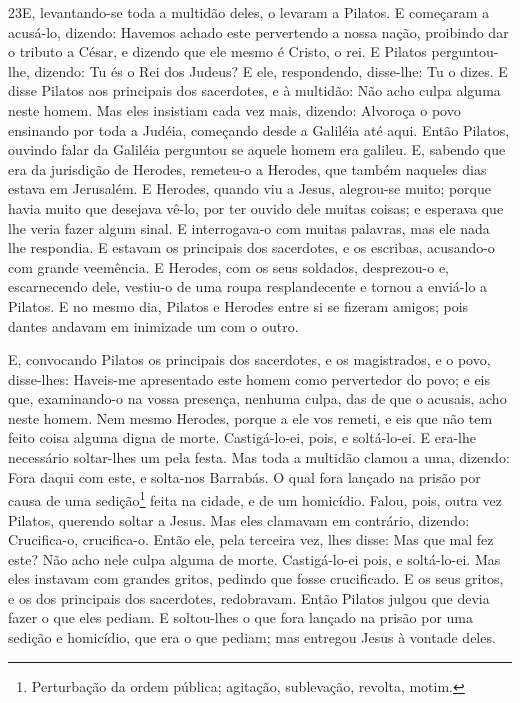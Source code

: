 \medskip

\lettrine{23} E, levantando-se toda a multidão deles, o
levaram a Pilatos. E começaram a acusá-lo, dizendo: Havemos
achado este pervertendo a nossa nação, proibindo dar o tributo a
César, e dizendo que ele mesmo é Cristo, o rei. E Pilatos
perguntou-lhe, dizendo: Tu és o Rei dos Judeus? E ele, respondendo,
disse-lhe: Tu o dizes. E disse Pilatos aos principais dos
sacerdotes, e à multidão: Não acho culpa alguma neste homem. Mas
eles insistiam cada vez mais, dizendo: Alvoroça o povo ensinando por
toda a Judéia, começando desde a Galiléia até aqui. Então
Pilatos, ouvindo falar da Galiléia perguntou se aquele homem era
galileu. E, sabendo que era da jurisdição de Herodes, remeteu-o
a Herodes, que também naqueles dias estava em Jerusalém. E
Herodes, quando viu a Jesus, alegrou-se muito; porque havia muito
que desejava vê-lo, por ter ouvido dele muitas coisas; e esperava
que lhe veria fazer algum sinal. E interrogava-o com muitas
palavras, mas ele nada lhe respondia. E estavam os principais
dos sacerdotes, e os escribas, acusando-o com grande veemência.
E Herodes, com os seus soldados, desprezou-o e, escarnecendo
dele, vestiu-o de uma roupa resplandecente e tornou a enviá-lo a
Pilatos. E no mesmo dia, Pilatos e Herodes entre si se
fizeram amigos; pois dantes andavam em inimizade um com o outro.

E, convocando Pilatos os principais dos sacerdotes, e os
magistrados, e o povo, disse-lhes: Haveis-me apresentado este
homem como pervertedor do povo; e eis que, examinando-o na vossa
presença, nenhuma culpa, das de que o acusais, acho neste homem.
Nem mesmo Herodes, porque a ele vos remeti, e eis que não tem
feito coisa alguma digna de morte. Castigá-lo-ei, pois, e
soltá-lo-ei. E era-lhe necessário soltar-lhes um pela festa.
Mas toda a multidão clamou a uma, dizendo: Fora daqui com
este, e solta-nos Barrabás. O qual fora lançado na prisão por
causa de uma sedição\footnote{Perturbação da ordem pública;
agitação, sublevação, revolta, motim.} feita na cidade, e de um
homicídio. Falou, pois, outra vez Pilatos, querendo soltar a
Jesus. Mas eles clamavam em contrário, dizendo: Crucifica-o,
crucifica-o. Então ele, pela terceira vez, lhes disse: Mas
que mal fez este? Não acho nele culpa alguma de morte. Castigá-lo-ei
pois, e soltá-lo-ei. Mas eles instavam com grandes gritos,
pedindo que fosse crucificado. E os seus gritos, e os dos principais
dos sacerdotes, redobravam. Então Pilatos julgou que devia
fazer o que eles pediam. E soltou-lhes o que fora lançado na
prisão por uma sedição e homicídio, que era o que pediam; mas
entregou Jesus à vontade deles.

